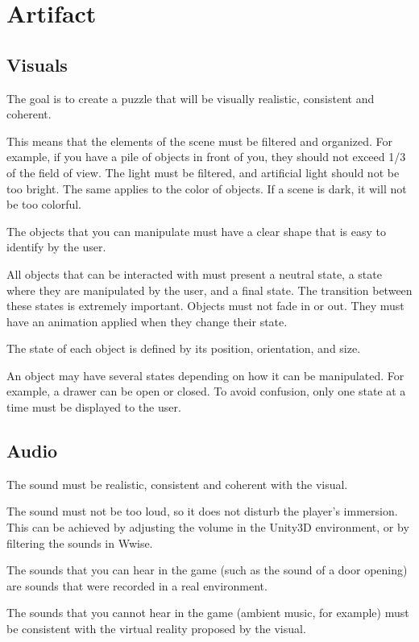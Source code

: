 \documentclass[lettersize,journal]{IEEEtran}
\begin{document}
\section{Artifact}
\subsection {Visuals}


The goal is to create a puzzle that will be visually realistic, consistent and coherent.

This means that the elements of the scene must be filtered and organized. For example, if you have a pile of objects in front of you, they should not exceed 1/3 of the field of view. The light must be filtered, and artificial light should not be too bright. The same applies to the color of objects. If a scene is dark, it will not be too colorful.

The objects that you can manipulate must have a clear shape that is easy to identify by the user.

All objects that can be interacted with must present a neutral state, a state where they are manipulated by the user, and a final state. The transition between these states is extremely important. Objects must not fade in or out. They must have an animation applied when they change their state.

The state of each object is defined by its position, orientation, and size.

An object may have several states depending on how it can be manipulated. For example, a drawer can be open or closed. To avoid confusion, only one state at a time must be displayed to the user. 


\subsection {Audio}


The sound must be realistic, consistent and coherent with the visual.


The sound must not be too loud, so it does not disturb the player's immersion. This can be achieved by adjusting the volume in the Unity3D environment, or by filtering the sounds in Wwise.


The sounds that you can hear in the game (such as the sound of a door opening) are sounds that were recorded in a real environment.


The sounds that you cannot hear in the game (ambient music, for example) must be consistent with the virtual reality proposed by the visual.
\end{document}
